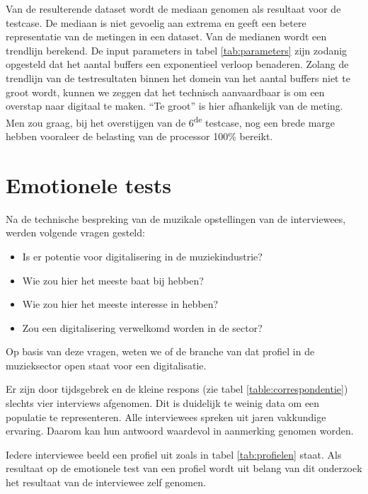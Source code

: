 Van de resulterende dataset wordt de mediaan genomen als resultaat voor de testcase. De mediaan is niet gevoelig aan extrema en geeft een betere representatie van de metingen in een dataset. \autocite{median} Van de medianen wordt een trendlijn berekend. De input parameters in tabel \ref{tab:parameters} zijn zodanig opgesteld dat het aantal buffers een exponentieel verloop benaderen. Zolang de trendlijn van de testresultaten binnen het domein van het aantal buffers niet te groot wordt, kunnen we zeggen dat het technisch aanvaardbaar is om een overstap naar digitaal te maken. ``Te groot'' is hier afhankelijk van de meting. Men zou graag, bij het overstijgen van de 6\textsuperscript{de} testcase, nog een brede marge hebben vooraleer de belasting van de processor 100\% bereikt.

\section{Emotionele tests}
\label{sec:methodologie:emotioneletests}

Na de technische bespreking van de muzikale opstellingen van de interviewees, werden volgende vragen gesteld:

\begin{itemize}
	\item Is er potentie voor digitalisering in de muziekindustrie?
	\item Wie zou hier het meeste baat bij hebben?
	\item Wie zou hier het meeste interesse in hebben?
	\item Zou een digitalisering verwelkomd worden in de sector?
\end{itemize}

Op basis van deze vragen, weten we of de branche van dat profiel in de muzieksector open staat voor een digitalisatie.

Er zijn door tijdsgebrek en de kleine respons (zie tabel \ref{table:correspondentie}) slechts vier interviews afgenomen. Dit is duidelijk te weinig data om een populatie te representeren. Alle interviewees spreken uit jaren vakkundige ervaring. Daarom kan hun antwoord waardevol in aanmerking genomen worden. 

Iedere interviewee beeld een profiel uit zoals in tabel \ref{tab:profielen} staat. Als resultaat op de emotionele test van een profiel wordt uit belang van dit onderzoek het resultaat van de interviewee zelf genomen.

